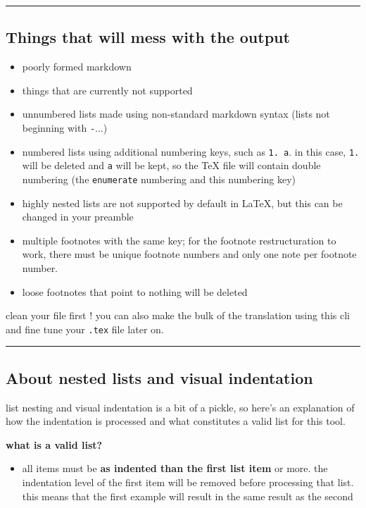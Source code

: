 \par\noindent\rule{\linewidth}{0.4pt}
\subsection{Things that will mess with the output}

\begin{itemize}
\item poorly formed markdown
\item things that are currently not supported
\item unnumbered lists made using non-standard markdown syntax (lists not beginning with \texttt{-}...)
\item numbered lists using additional numbering keys, such as \texttt{1. a}. in this case, \texttt{1.} will be deleted and \texttt{a} will be kept, so the TeX file will contain double numbering (the \texttt{enumerate} numbering and this numbering key)
\item highly nested lists are not supported by default in LaTeX, but this can be changed in your preamble
\item multiple footnotes with the same key; for the footnote restructuration to work, there must be unique footnote numbers and only one note per footnote number.
\item loose footnotes that point to nothing will be deleted 
\end{itemize}

clean your file first ! you can also make the bulk of the translation using this cli and fine tune your \texttt{.tex} 
file later on.

\par\noindent\rule{\linewidth}{0.4pt}
\subsection{About nested lists and visual indentation}

list nesting and visual indentation is a bit of a pickle, so here's an explanation of how
the indentation is processed and what constitutes a valid list for this tool.

\textbf{what is a valid list?}

\begin{itemize}
\item all items must be \textbf{as indented than the first list item} or more. the indentation level of the first item will be removed before processing that list. this means that the first example will result in the same result as the second 
\end{itemize}

